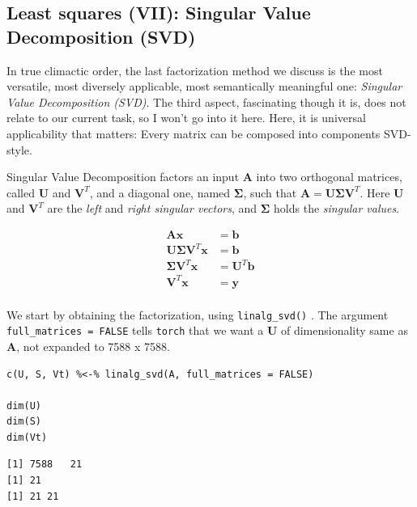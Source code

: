 \documentclass[
  letterpaper,
]{krantz}
\begin{document}
\hypertarget{least-squares-vii-singular-value-decomposition-svd}{%
\subsection{\texorpdfstring{Least squares (VII): Singular Value
Decomposition
(SVD)}{Least squares (VII): Singular Value Decomposition (SVD)}}\label{least-squares-vii-singular-value-decomposition-svd}}

In true climactic order, the last factorization method we discuss is the
most versatile, most diversely applicable, most semantically meaningful
one: \emph{Singular Value Decomposition (SVD)}. The third aspect,
fascinating though it is, does not relate to our current task, so I
won't go into it here. Here, it is universal applicability that matters:
Every matrix can be composed into components SVD-style.

Singular Value Decomposition factors an input \(\mathbf{A}\) into two
orthogonal matrices, called \(\mathbf{U}\) and \(\mathbf{V}^T\), and a
diagonal one, named \(\symbf{\Sigma}\), such that
\(\mathbf{A} = \mathbf{U} \symbf{\Sigma} \mathbf{V}^T\). Here
\(\mathbf{U}\) and \(\mathbf{V}^T\) are the \emph{left} and \emph{right
singular vectors}, and \(\symbf{\Sigma}\) holds the \emph{singular
values}.

\[
\begin{aligned}
\mathbf{A}\mathbf{x} &= \mathbf{b}\\
\mathbf{U}\symbf{\Sigma}\mathbf{V}^T\mathbf{x} &= \mathbf{b}\\
\symbf{\Sigma}\mathbf{V}^T\mathbf{x} &= \mathbf{U}^T\mathbf{b}\\
\mathbf{V}^T\mathbf{x} &= \mathbf{y}\\
\end{aligned}
\]

We start by obtaining the factorization, using
\texttt{linalg\_svd()} .
The argument \texttt{full\_matrices\ =\ FALSE} tells \texttt{torch} that
we want a \(\mathbf{U}\) of dimensionality same as \(\mathbf{A}\), not
expanded to 7588 x 7588.

\begin{verbatim}
c(U, S, Vt) %<-% linalg_svd(A, full_matrices = FALSE)

dim(U)
dim(S)
dim(Vt)
\end{verbatim}

\begin{verbatim}
[1] 7588   21
[1] 21
[1] 21 21
\end{verbatim}
\end{document}
